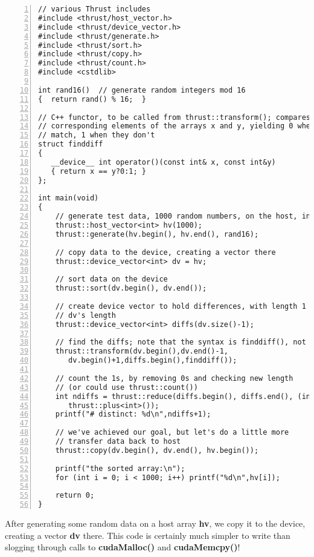 \begin{lstlisting}[numbers=left]
// various Thrust includes
#include <thrust/host_vector.h>
#include <thrust/device_vector.h>
#include <thrust/generate.h>
#include <thrust/sort.h>
#include <thrust/copy.h>
#include <thrust/count.h>
#include <cstdlib>

int rand16()  // generate random integers mod 16
{  return rand() % 16;  }

// C++ functor, to be called from thrust::transform(); compares
// corresponding elements of the arrays x and y, yielding 0 when they
// match, 1 when they don't
struct finddiff
{
   __device__ int operator()(const int& x, const int&y)
   { return x == y?0:1; }
};

int main(void)
{
    // generate test data, 1000 random numbers, on the host, int type
    thrust::host_vector<int> hv(1000);
    thrust::generate(hv.begin(), hv.end(), rand16);

    // copy data to the device, creating a vector there
    thrust::device_vector<int> dv = hv;

    // sort data on the device 
    thrust::sort(dv.begin(), dv.end());

    // create device vector to hold differences, with length 1 less than
    // dv's length
    thrust::device_vector<int> diffs(dv.size()-1);

    // find the diffs; note that the syntax is finddiff(), not finddiff
    thrust::transform(dv.begin(),dv.end()-1,
       dv.begin()+1,diffs.begin(),finddiff());

    // count the 1s, by removing 0s and checking new length 
    // (or could use thrust::count())
    int ndiffs = thrust::reduce(diffs.begin(), diffs.end(), (int) 0,
       thrust::plus<int>());
    printf("# distinct: %d\n",ndiffs+1);

    // we've achieved our goal, but let's do a little more
    // transfer data back to host
    thrust::copy(dv.begin(), dv.end(), hv.begin());

    printf("the sorted array:\n");
    for (int i = 0; i < 1000; i++) printf("%d\n",hv[i]);

    return 0;
}
\end{lstlisting}

After generating some random data on a host array {\bf hv}, we copy it
to the device, creating a vector {\bf dv} there.  This code is certainly
much simpler to write than slogging through calls to {\bf cudaMalloc()}
and {\bf cudaMemcpy()}!


